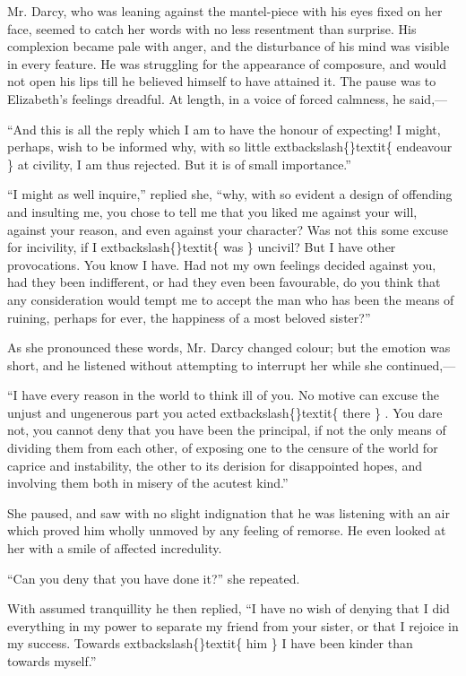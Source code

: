 \documentclass[10pt]{book}
\begin{document}
   Mr. Darcy, who was leaning against the mantel-piece with his eyes fixed
on her face, seemed to catch her words with no less resentment than
surprise. His complexion became pale with anger, and the disturbance of
his mind was visible in every feature. He was struggling for the
appearance of composure, and would not open his lips till he believed
himself to have attained it. The pause was to Elizabeth’s feelings
dreadful. At length, in a voice of forced calmness, he said,—
  

   “And this is all the reply which I am to have the honour of expecting! I
might, perhaps, wish to be informed why, with so little
   	extbackslash\{\}textit\{
    endeavour
   \}
   at
civility, I am thus rejected. But it is of small importance.”
  

   “I might as well inquire,” replied she, “why, with so evident a design
of offending and insulting me, you chose to tell me that you liked me
against your will, against your reason, and even against your character?
Was not this some excuse for incivility, if I
   	extbackslash\{\}textit\{
    was
   \}
   uncivil? But I have
other provocations. You know I have.
   Had not my own feelings decided
against you, had they been indifferent, or had they even been
favourable, do you think that any consideration would tempt me to accept
the man who has been the means of ruining, perhaps for ever, the
happiness of a most beloved sister?”
  

   As she pronounced these words, Mr. Darcy changed colour; but the emotion
was short, and he listened without attempting to interrupt her while she
continued,—
  

   “I have every reason in the world to think ill of you. No motive can
excuse the unjust and ungenerous part you acted
   	extbackslash\{\}textit\{
    there
   \}
   . You dare not,
you cannot deny that you have been the principal, if not the only means
of dividing them from each other, of exposing one to the censure of the
world for caprice and instability, the other to its derision for
disappointed hopes, and involving them both in misery of the acutest
kind.”
  

   She paused, and saw with no slight indignation that he was listening
with an air which proved him wholly unmoved by any feeling of remorse.
He even looked at her with a smile of affected incredulity.
  

   “Can you deny that you have done it?” she repeated.
  

   With assumed tranquillity he then replied, “I have no wish of denying
that I did everything in my power to separate my friend from your
sister, or that I rejoice in my success. Towards
   	extbackslash\{\}textit\{
    him
   \}
   I have been
kinder than towards myself.”
  
\end{document}

